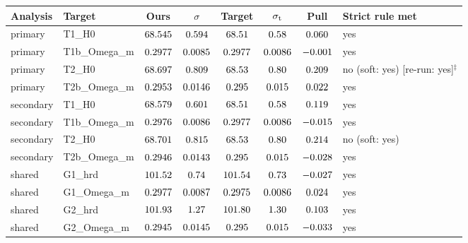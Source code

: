 \begin{tabular}{llcccccl}
\toprule
Analysis & Target & Ours & $\sigma$ & Target & $\sigma_{\rm t}$ & Pull & Strict rule met \\
\midrule
primary & T1\_H0 & $68.545$ & $0.594$ & $68.51$ & $0.58$ & $0.060$ & yes \\
primary & T1b\_Omega\_m & $0.2977$ & $0.0085$ & $0.2977$ & $0.0086$ & $-0.001$ & yes \\
primary & T2\_H0 & $68.697$ & $0.809$ & $68.53$ & $0.80$ & $0.209$ & no (soft: yes) [re-run: yes]$^\ddagger$ \\
primary & T2b\_Omega\_m & $0.2953$ & $0.0146$ & $0.295$ & $0.015$ & $0.022$ & yes \\
secondary & T1\_H0 & $68.579$ & $0.601$ & $68.51$ & $0.58$ & $0.119$ & yes \\
secondary & T1b\_Omega\_m & $0.2976$ & $0.0086$ & $0.2977$ & $0.0086$ & $-0.015$ & yes \\
secondary & T2\_H0 & $68.701$ & $0.815$ & $68.53$ & $0.80$ & $0.214$ & no (soft: yes) \\
secondary & T2b\_Omega\_m & $0.2946$ & $0.0143$ & $0.295$ & $0.015$ & $-0.028$ & yes \\
shared & G1\_hrd & $101.52$ & $0.74$ & $101.54$ & $0.73$ & $-0.027$ & yes \\
shared & G1\_Omega\_m & $0.2977$ & $0.0087$ & $0.2975$ & $0.0086$ & $0.024$ & yes \\
shared & G2\_hrd & $101.93$ & $1.27$ & $101.80$ & $1.30$ & $0.103$ & yes \\
shared & G2\_Omega\_m & $0.2945$ & $0.0145$ & $0.295$ & $0.015$ & $-0.033$ & yes \\
\bottomrule
\end{tabular}
